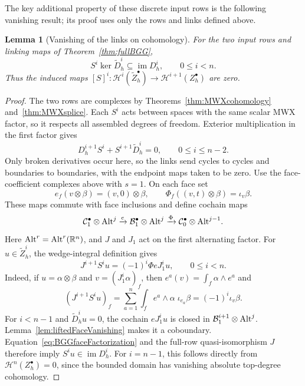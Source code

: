 \documentclass[10pt]{amsart}
\numberwithin{equation}{section}
\newtheorem{lemma}[theorem]{Lemma}
\begin{document}
The key additional property of these discrete input rows is the following
vanishing result; its proof uses only the rows and links defined above.
\begin{lemma}[Vanishing of the links on cohomology]\label{lem:BGGzeroCohomology}
For the two input rows and linking maps of Theorem~\ref{thm:fullBGG},
\[
S^i\ker\widetilde D_h^i\subseteq\operatorname{im}D_h^i,
\qquad 0\leq i<n.
\]
Thus the induced maps
$[S]^i:\mathscr H^i(\widetilde Z_h^\bullet)\to
\mathscr H^{i+1}(Z_h^\bullet)$ are zero.
\end{lemma}
\begin{proof}
The two rows are complexes by Theorems~\ref{thm:MWXcohomology}
and~\ref{thm:MWXsplice}. Each $S^i$ acts between spaces with the same
scalar MWX factor, so it respects all assembled degrees of freedom.
Exterior multiplication in the first factor gives
\[
D_h^{i+1}S^i+S^{i+1}\widetilde D_h^i=0,
\qquad 0\leq i\leq n-2.
\]
Only broken derivatives occur here, so the links send cycles to cycles
and boundaries to boundaries, with the endpoint maps taken to be zero.
Use the face-coefficient complexes above with $s=1$. On each face set
\[
e_f(v\otimes\beta)=(v,0)\otimes\beta,\qquad
\Phi_f((v,t)\otimes\beta)=\iota_v\beta.
\]
These maps commute with face inclusions and define cochain maps
\[
\mathcal C_1^\bullet\otimes{\rm Alt}^j
\xrightarrow{e}\mathcal B_1^\bullet\otimes{\rm Alt}^j
\xrightarrow{\Phi}\mathcal C_0^\bullet\otimes{\rm Alt}^{j-1}.
\]
Here ${\rm Alt}^r={\rm Alt}^r(\mathbb R^n)$, and $J$ and $J_1$ act on the
first alternating factor. For $u\in\widetilde Z_h^i$, the
wedge-integral definition gives
\begin{equation}\label{eq:BGGfaceFactorization}
J^{i+1}S^iu=(-1)^i\Phi eJ_1^iu,\qquad 0\leq i<n.
\end{equation}
Indeed, if $u=\alpha\otimes\beta$ and $v=(J_1^i\alpha)_f$, then
$e^a(v)=\int_f\alpha\wedge e^a$ and
\[
(J^{i+1}S^iu)_f
=\sum_{a=1}^n\int_f e^a\wedge\alpha\;\iota_{e_a}\beta
=(-1)^i\iota_v\beta.
\]
For $i<n-1$ and $\widetilde D_h^iu=0$, the cochain $eJ_1^iu$ is closed
in $\mathcal B_1^{i+1}\otimes{\rm Alt}^j$.
Lemma~\ref{lem:liftedFaceVanishing} makes it a coboundary.
Equation~\eqref{eq:BGGfaceFactorization} and the full-row quasi-isomorphism
$J$ therefore imply $S^iu\in\operatorname{im}D_h^i$.
For $i=n-1$, this follows directly from $\mathscr H^n(Z_h^\bullet)=0$,
since the bounded domain has vanishing absolute top-degree cohomology.
\end{proof}
\end{document}
